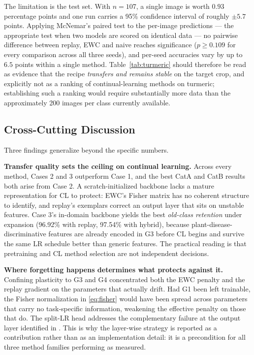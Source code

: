 \documentclass[journal]{IEEEtran}
\begin{document}
The limitation is the test set. With $n=107$, a single image is worth $0.93$
percentage points and one run carries a 95\% confidence interval of roughly $\pm5.7$
points. Applying McNemar's paired test to the per-image predictions --- the
appropriate test when two models are scored on identical data --- no pairwise
difference between replay, EWC and naive reaches significance ($p \geq 0.109$ for
every comparison across all three seeds), and per-seed accuracies vary by up to
$6.5$ points within a single method. Table~\ref{tab:turmeric} should therefore be
read as evidence that the recipe \emph{transfers and remains stable} on the target
crop, and explicitly not as a ranking of continual-learning methods on turmeric;
establishing such a ranking would require substantially more data than the
approximately 200 images per class currently available.


\subsection{Cross-Cutting Discussion}

Three findings generalize beyond the specific numbers.

\textbf{Transfer quality sets the ceiling on continual learning.} Across every method,
Cases 2 and 3 outperform Case 1, and the best CatA and CatB results both arise from
Case 2. A scratch-initialized backbone lacks a mature representation for CL to
protect: EWC's Fisher matrix has no coherent structure to identify, and replay's
exemplars correct an output layer that sits on unstable features. Case 3's in-domain
backbone yields the best \emph{old-class retention} under expansion (96.92\% with
replay, 97.54\% with hybrid), because plant-disease-discriminative features are
already encoded in G3 before CL begins and survive the same LR schedule better than
generic features. The practical reading is that pretraining and CL method selection
are not independent decisions.

\textbf{Where forgetting happens determines what protects against it.} Confining
plasticity to G3 and G4 concentrated both the EWC penalty and the replay gradient on
the parameters that actually drift. Had G1 been left trainable, the Fisher
normalization in \eqref{eq:fisher} would have been spread across parameters that carry
no task-specific information, weakening the effective penalty on those that do. The
split-LR head addresses the complementary failure at the output layer identified in
\cite{ref18}. This is why the layer-wise strategy is reported as a contribution rather
than as an implementation detail: it is a precondition for all three method families
performing as measured.
\end{document}
